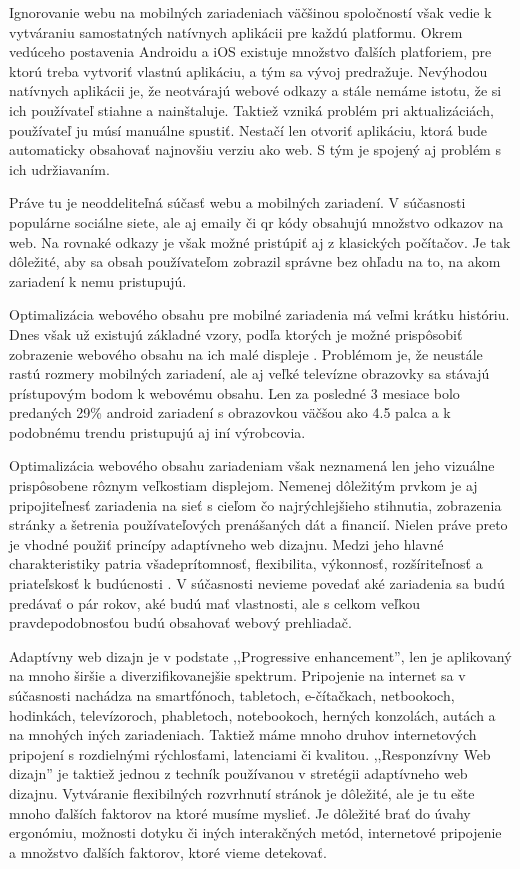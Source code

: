 Ignorovanie webu na mobilných zariadeniach väčšinou spoločností však vedie k vytváraniu samostatných natívnych aplikácii pre každú platformu. Okrem vedúceho postavenia Androidu a iOS existuje množstvo ďalších platforiem, pre ktorú treba vytvoriť vlastnú aplikáciu, a tým sa vývoj predražuje. Nevýhodou natívnych aplikácii je, že neotvárajú webové odkazy a stále nemáme istotu, že si ich používateľ stiahne a nainštaluje. Taktiež vzniká problém pri aktualizáciách, používateľ ju músí manuálne spustiť. Nestačí len otvoriť aplikáciu, ktorá bude automaticky obsahovať najnovšiu verziu ako web. S tým je spojený aj problém s ich udržiavaním.

Práve tu je neoddeliteľná súčasť webu a mobilných zariadení. V súčasnosti populárne sociálne siete, ale aj emaily či qr kódy obsahujú množstvo odkazov na web. Na rovnaké odkazy je však možné pristúpiť aj z klasických počítačov. Je tak dôležité, aby sa obsah používateľom zobrazil správne bez ohľadu na to, na akom zariadení k nemu pristupujú.

Optimalizácia webového obsahu pre mobilné zariadenia má veľmi krátku históriu. Dnes však už existujú základné vzory, podľa ktorých je možné prispôsobiť zobrazenie webového obsahu na ich malé displeje \cite{mobilebookpatterns, navigation}. Problémom je, že neustále rastú rozmery mobilných zariadení, ale aj veľké televízne obrazovky sa stávajú prístupovým bodom k webovému obsahu. Len za posledné 3 mesiace bolo predaných 29\% android zariadení s obrazovkou väčšou ako 4.5 palca \cite{bigscreen} a k podobnému trendu pristupujú aj iní výrobcovia.

Optimalizácia webového obsahu zariadeniam však neznamená len jeho vizuálne prispôsobene rôznym veľkostiam displejom. Nemenej dôležitým prvkom je aj pripojiteľnesť zariadenia na sieť s cieľom čo najrýchlejšieho stihnutia, zobrazenia stránky a šetrenia používateľových prenášaných dát a financií. Nielen práve preto je vhodné použiť princípy adaptívneho web dizajnu. Medzi jeho hlavné charakteristiky patria všadeprítomnosť, flexibilita, výkonnosť, rozšíriteľnosť a priateľskosť k budúcnosti \cite{adaptive}. V súčasnosti nevieme povedať aké zariadenia sa budú predávať o pár rokov, aké budú mať vlastnosti, ale s celkom veľkou pravdepodobnosťou budú obsahovať webový prehliadač. 

Adaptívny web dizajn je v podstate ,,Progressive enhancement'', len je aplikovaný na mnoho širšie a diverzifikovanejšie spektrum. Pripojenie na internet sa v súčasnosti nachádza na smartfónoch, tabletoch, e-čítačkach, netbookoch, hodinkách, televízoroch, phabletoch, notebookoch, herných konzolách, autách a na mnohých iných zariadeniach. Taktiež máme mnoho druhov internetových pripojení s rozdielnými rýchlosťami, latenciami či kvalitou. ,,Responzívny Web dizajn'' je taktiež jednou z techník používanou v stretégii adaptívneho web dizajnu. Vytváranie flexibilných rozvrhnutí stránok je dôležité, ale je tu ešte mnoho ďalších faktorov na ktoré musíme myslieť. Je dôležité brať do úvahy ergonómiu, možnosti dotyku či iných interakčných metód, internetové pripojenie a množstvo ďalších faktorov, ktoré vieme detekovať.

